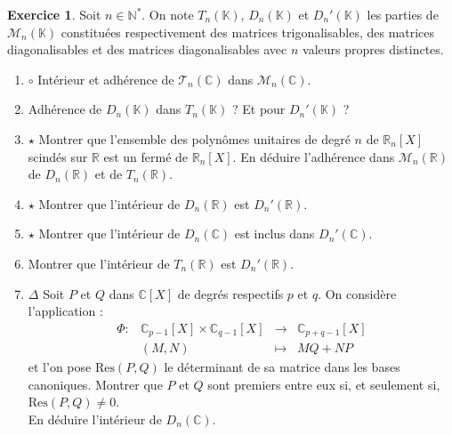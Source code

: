 \documentclass[french]{article}
\newcommand{\N}{\mathbb{N}}
\newcommand{\R}{\mathbb{R}}
\newcommand{\C}{\mathbb{C}}
\newcommand{\K}{\mathbb{K}}
\newcommand{\st}{^*}
\theoremstyle{definition}
\newtheorem{exo}{Exercice}
\begin{document}
\begin{exo}
	Soit $n\in\N\st$. On note $T_n(\K)$, $D_n(\K)$ et $D_n'(\K)$ les parties de $\mathcal{M}_n(\K)$ constituées respectivement des matrices trigonalisables, des matrices diagonalisables et des matrices diagonalisables avec $n$ valeurs propres distinctes.
	\begin{enumerate}
		\item $\circ$ Intérieur et adhérence de $\mathcal{T}_n(\C)$ dans $\mathcal{M}_n(\C)$.
		\item Adhérence de $D_n(\K)$ dans $T_n(\K)$ ? Et pour $D_n'(\K)$ ?
		\item $\star$ Montrer que l'ensemble des polynômes unitaires de degré $n$ de $\R_n[X]$ scindés sur $\R$ est un fermé de $\R_n[X]$. En déduire l'adhérence dans $\mathcal{M}_n(\R)$ de $D_n(\R)$ et de $T_n(\R)$.
		\item $\star$ Montrer que l'intérieur de $D_n(\R)$ est $D_n'(\R)$.
		\item $\star$ Montrer que l'intérieur de $D_n(\C)$ est inclus dans $D_n'(\C)$.
		\item Montrer que l'intérieur de $T_n(\R)$ est $D_n'(\R)$.
		\item $\Delta$ Soit $P$ et $Q$ dans $\C[X]$ de degrés respectifs $p$ et $q$. On considère l'application :
		$$\begin{array}{lrcl}
			\Phi:&\C_{p-1}[X]\times\C_{q-1}[X]&\longrightarrow&\C_{p+q-1}[X]\\
			&(M,N)&\longmapsto&MQ+NP
		\end{array}$$ et l'on pose $\text{Res}(P,Q)$ le déterminant de sa matrice dans les bases canoniques. Montrer que $P$ et $Q$ sont premiers entre eux si, et seulement si, $\text{Res}(P,Q)\ne 0$. \\
		En déduire l'intérieur de $D_n(\C)$.
	\end{enumerate}
\end{exo}
\end{document}
